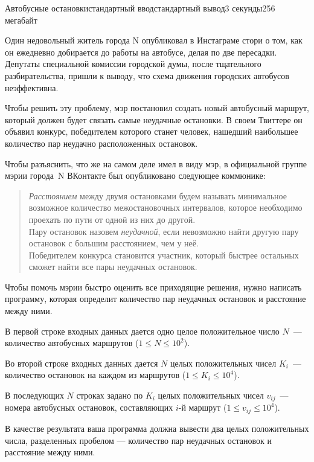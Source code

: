 \begin{problem}{Автобусные остановки}{стандартный ввод}{стандартный вывод}{3 секунды}{256 мегабайт}

Один недовольный житель города N опубликовал  в Инстаграме стори о том, как он ежедневно добирается до работы на автобусе, делая по две пересадки. Депутаты специальной комиссии городской думы, после тщательного разбирательства, пришли к выводу, что схема движения городских автобусов неэффективна.

Чтобы решить эту проблему, мэр постановил создать новый автобусный маршрут, который должен будет связать самые неудачные остановки. В своем Твиттере он объявил конкурс, победителем которого станет человек, нашедший наибольшее количество пар неудачно расположенных остановок.

Чтобы разъяснить, что же на самом деле имел в виду мэр, в официальной группе мэрии города~N ВКонтакте был опубликовано следующее коммюнике:
\begin{quote}
\textit{Расстоянием} между двумя остановками будем называть минимальное возможное
количество межостановочных интервалов, которое необходимо проехать по пути от одной из них до другой.\\
Пару остановок назовем \textit{неудачной}, если невозможно найти другую пару остановок с большим расстоянием, чем у неё.\\
Победителем конкурса становится участник, который быстрее остальных сможет найти все пары неудачных остановок.
\end{quote}
Чтобы помочь мэрии быстро оценить все приходящие решения, нужно написать программу, которая определит количество пар неудачных остановок и расстояние между ними.


\InputFile
В первой строке входных данных дается одно целое положительное число $N$~--- количество автобусных маршрутов ($1 \leq N \leq 10^2$).

Во второй строке входных данных дается $N$ целых положительных чисел $K_i$~--- количество остановок на каждом из маршрутов ($1 \leq K_i \leq 10^4$).

В последующих $N$ строках задано по $K_i$ целых положительных чисел $v_{ij}$~--- номера автобусных остановок, составляющих $i$-й маршрут ($1 \leq v_{ij} \leq 10^4$).


\OutputFile
В качестве результата ваша программа должна вывести два целых положительных числа, разделенных пробелом --- количество пар неудачных остановок и расстояние между ними.

\Example

\begin{example}
%
\end{example}

\end{problem}

